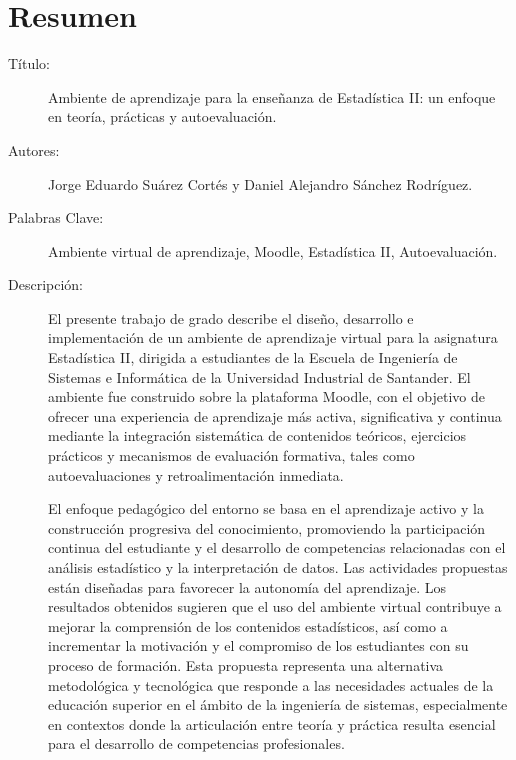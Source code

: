 \documentclass[letter,oneside,12pt,spanish]{report}
\begin{document}
\newpage

\newpage

\chapter*{Resumen}

\footnotesize{
\begin{description}
  \item[Título:] Ambiente de aprendizaje para la enseñanza de Estadística II: un enfoque en teoría, prácticas y autoevaluación.
  \item[Autores:] Jorge Eduardo Suárez Cortés y Daniel Alejandro Sánchez Rodríguez.
  \item[Palabras Clave:]Ambiente virtual de aprendizaje, Moodle, Estadística II, Autoevaluación.
  \item[Descripción:] El presente trabajo de grado describe el diseño, desarrollo e implementación 
  de un ambiente de aprendizaje virtual para la asignatura Estadística II, dirigida a estudiantes de 
  la Escuela de Ingeniería de Sistemas e Informática de la Universidad Industrial de Santander. El 
  ambiente fue construido sobre la plataforma Moodle, con el objetivo de ofrecer una experiencia de 
  aprendizaje más activa, significativa y continua mediante la integración sistemática de contenidos 
  teóricos, ejercicios prácticos y mecanismos de evaluación formativa, tales como autoevaluaciones y 
  retroalimentación inmediata.

  El enfoque pedagógico del entorno se basa en el aprendizaje activo y la construcción progresiva del 
  conocimiento, promoviendo la participación continua del estudiante y el desarrollo de competencias 
  relacionadas con el análisis estadístico y la interpretación de datos. Las actividades propuestas están 
  diseñadas para favorecer la autonomía del aprendizaje. Los resultados obtenidos sugieren que el uso del
  ambiente virtual contribuye a mejorar la comprensión de los contenidos estadísticos, así como a incrementar 
  la motivación y el compromiso de los estudiantes con su proceso de formación. Esta propuesta representa 
  una alternativa metodológica y tecnológica que responde a las necesidades actuales de la educación superior
  en el ámbito de la ingeniería de sistemas, especialmente en contextos donde la articulación entre teoría y 
  práctica resulta esencial para el desarrollo de competencias profesionales.
  
  
\end{description}}\normalsize
\end{document}
